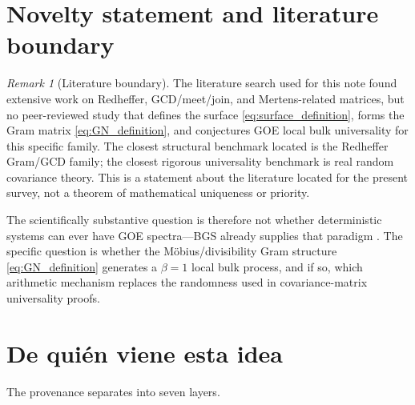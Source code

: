 \documentclass[11pt]{amsart}
\numberwithin{equation}{section}
\theoremstyle{plain}
\theoremstyle{definition}
\theoremstyle{remark}
\newtheorem{remark}[theorem]{Remark}
\begin{document}
\section{Novelty statement and literature boundary}
\label{sec:novelty_boundary}

\begin{remark}[Literature boundary]
\label{rem:literature_boundary}
The literature search used for this note found extensive work on Redheffer, GCD/meet/join, and Mertens-related matrices, but no peer-reviewed study that defines the surface \eqref{eq:surface_definition}, forms the Gram matrix \eqref{eq:GN_definition}, and conjectures GOE local bulk universality for this specific family.  The closest structural benchmark located is the Redheffer Gram/GCD family; the closest rigorous universality benchmark is real random covariance theory.  This is a statement about the literature located for the present survey, not a theorem of mathematical uniqueness or priority.
\end{remark}

The scientifically substantive question is therefore not whether deterministic systems can ever have GOE spectra---BGS already supplies that paradigm \cite{BGS1984}.  The specific question is whether the M\"obius/divisibility Gram structure \eqref{eq:GN_definition} generates a $\beta=1$ local bulk process, and if so, which arithmetic mechanism replaces the randomness used in covariance-matrix universality proofs.

\section{De qui\'en viene esta idea}
\label{sec:provenance}

The provenance separates into seven layers.
\end{document}
